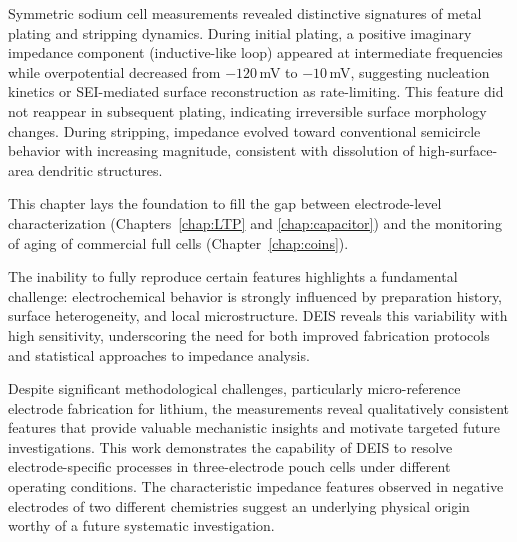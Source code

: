 Symmetric sodium cell measurements revealed distinctive signatures of metal plating and stripping dynamics. During initial plating, a positive imaginary impedance component (inductive-like loop) appeared at intermediate frequencies while overpotential decreased from $-120$\,mV to $-10$\,mV, suggesting nucleation kinetics or SEI-mediated surface reconstruction as rate-limiting. This feature did not reappear in subsequent plating, indicating irreversible surface morphology changes. During stripping, impedance evolved toward conventional semicircle behavior with increasing magnitude, consistent with dissolution of high-surface-area dendritic structures.

This chapter lays the foundation to fill the gap between electrode-level characterization (Chapters~\ref{chap:LTP} and \ref{chap:capacitor}) and the monitoring of aging of commercial full cells (Chapter~\ref{chap:coins}).

The inability to fully reproduce certain features highlights a fundamental challenge: electrochemical behavior is strongly influenced by preparation history, surface heterogeneity, and local microstructure. DEIS reveals this variability with high sensitivity, underscoring the need for both improved fabrication protocols and statistical approaches to impedance analysis.

Despite significant methodological challenges, particularly micro-reference electrode fabrication for lithium, the measurements reveal qualitatively consistent features that provide valuable mechanistic insights and motivate targeted future investigations.
This work demonstrates the capability of DEIS to resolve electrode-specific processes in three-electrode pouch cells under different operating conditions. 
The characteristic impedance features observed in negative electrodes of two different chemistries suggest an underlying physical origin worthy of a future systematic investigation.